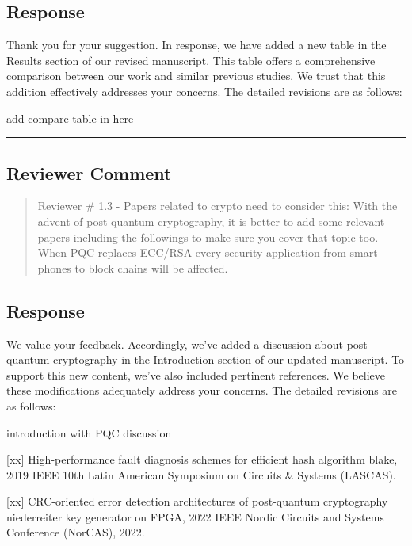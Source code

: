 \subsection{Response}
Thank you for your suggestion. In response, we have added a new table in the Results section of our revised manuscript. This table offers a comprehensive comparison between our work and similar previous studies. We trust that this addition effectively addresses your concerns. The detailed revisions are as follows:

\color{blue}

add compare table in here

\color{black}

\noindent\rule{\linewidth}{2.0pt}

\subsection{Reviewer Comment}
\begin{mdframed}
	\begin{quote}
		Reviewer \# 1.3 - Papers related to crypto need to consider this: With the advent of post-quantum cryptography, it is better to add some relevant papers including the followings to make sure you cover that topic too. When PQC replaces ECC/RSA every security application from smart phones to block chains will be affected.
	\end{quote}
\end{mdframed}

\subsection{Response}

We value your feedback. Accordingly, we've added a discussion about post-quantum cryptography in the Introduction section of our updated manuscript. To support this new content, we've also included pertinent references. We believe these modifications adequately address your concerns. The detailed revisions are as follows:


\color{blue}

introduction with PQC discussion


	[xx] High-performance fault diagnosis schemes for efficient hash algorithm blake, 2019 IEEE 10th Latin American Symposium on Circuits \& Systems (LASCAS).

	[xx] CRC-oriented error detection architectures of post-quantum cryptography niederreiter key generator on FPGA, 2022 IEEE Nordic Circuits and Systems Conference (NorCAS), 2022.


